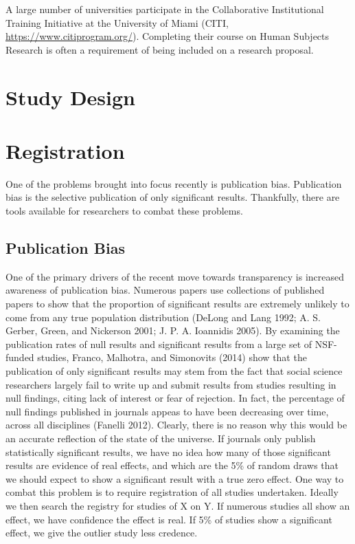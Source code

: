 \documentclass[12pt] {article}
\begin{document}
A large number of universities participate in the Collaborative
Institutional Training Initiative at the University of Miami (CITI,
\url{https://www.citiprogram.org/}). Completing their course on Human
Subjects Research is often a requirement of being included on a research
proposal.
\section{Study Design}\label{study-design}

\section{Registration}\label{registration}

One of the problems brought into focus recently is publication bias.
Publication bias is the selective publication of only significant
results. Thankfully, there are tools available for researchers to combat
these problems.

\subsection{Publication Bias}\label{publication-bias}

One of the primary drivers of the recent move towards transparency is
increased awareness of publication bias. Numerous papers use collections
of published papers to show that the proportion of significant results
are extremely unlikely to come from any true population distribution
(DeLong and Lang 1992; A. S. Gerber, Green, and Nickerson 2001; J. P. A.
Ioannidis 2005). By examining the publication rates of null results and
significant results from a large set of NSF-funded studies, Franco,
Malhotra, and Simonovits (2014) show that the publication of only
significant results may stem from the fact that social science
researchers largely fail to write up and submit results from studies
resulting in null findings, citing lack of interest or fear of
rejection. In fact, the percentage of null findings published in
journals appeas to have been decreasing over time, across all
disciplines (Fanelli 2012). Clearly, there is no reason why this would
be an accurate reflection of the state of the universe. If journals only
publish statistically significant results, we have no idea how many of
those significant results are evidence of real effects, and which are
the 5\% of random draws that we should expect to show a significant
result with a true zero effect. One way to combat this problem is to
require registration of all studies undertaken. Ideally we then search
the registry for studies of X on Y. If numerous studies all show an
effect, we have confidence the effect is real. If 5\% of studies show a
significant effect, we give the outlier study less credence.
\end{document}
